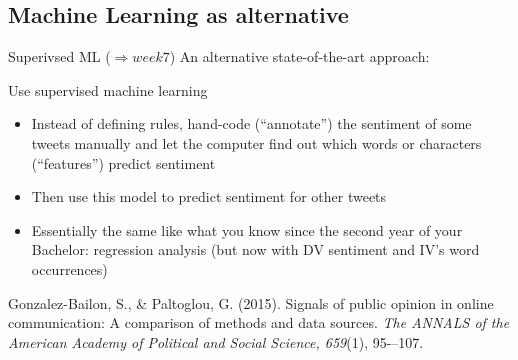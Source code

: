 \documentclass{beamer}
\begin{document}
\subsection{Machine Learning as alternative}
\begin{frame}{Superivsed ML ($\Rightarrow week 7$)}
	An alternative state-of-the-art approach:
	\begin{block}{Use supervised machine learning}
		\begin{itemize}
			\item Instead of defining rules, hand-code (``annotate'') the sentiment of some tweets manually and let the computer find out which words or characters (``features'') predict sentiment
			\item Then use this model to predict sentiment for other tweets
			\item Essentially the same like what you know since the second year of your Bachelor: regression analysis (but now with DV sentiment and IV's word occurrences)
		\end{itemize}
		\tiny{Gonzalez-Bailon, S., \& Paltoglou, G. (2015). Signals of public opinion in online communication: A comparison of methods and data sources. \emph{The ANNALS of the American Academy of Political and Social Science, 659}(1), 95-–107.}
	\end{block}
	
\end{frame}
\end{document}
